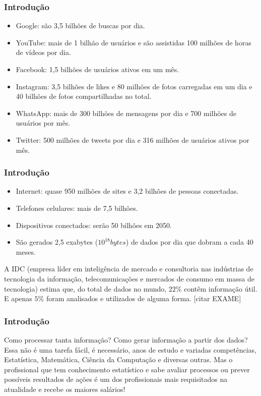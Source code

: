 \documentclass[14pt,aspectratio=1610]{beamer}
\begin{document}
\begin{frame}{}
\frametitle{Introdução}
\begin{block}{}
\justifying
\begin{itemize}
\item Google: são 3,5 bilhões de buscas por dia.\pause
\item YouTube: mais de 1 bilhão de usuários e são assistidas 100 milhões de horas de vídeos por dia.\pause
\item Facebook: 1,5 bilhões de usuários ativos em um mês.\pause
\item Instagram: 3,5 bilhões de likes e 80 milhões de fotos carregadas em um dia e 40 bilhões de fotos compartilhadas no total.\pause
\item WhatsApp: mais de 300 bilhões de mensagens por dia e 700 milhões de usuários por mês.\pause
\item Twitter: 500 milhões de tweets por dia e 316 milhões de usuários ativos por mês.
\end{itemize}
\end{block}
\end{frame}

\begin{frame}{}
\frametitle{Introdução}
\begin{block}{}
\justifying
\begin{itemize}
\item Internet: quase 950 milhões de sites e 3,2 bilhões de pessoas conectadas.\pause
\item Telefones celulares: mais de 7,5 bilhões.\pause
\item Dispositivos conectados: serão 50 bilhões em 2050.\pause
\item São gerados 2,5 exabytes ($10^{18} bytes$) de dados por dia que dobram a cada 40 meses.
\end{itemize}
\end{block}
\begin{block}{}
\justifying
A IDC (empresa líder em inteligência de mercado e consultoria nas indústrias de tecnologia da informação, telecomunicações e mercados de consumo em massa de tecnologia) estima que, do total de dados no mundo, $22\%$ contêm informação útil. E apenas $5\%$ foram analisados e utilizados de alguma forma. [citar EXAME]
\end{block}
\end{frame}

\begin{frame}{}
\frametitle{Introdução}
\begin{block}{}
\justifying
Como processar tanta informação? Como gerar informação a partir dos dados? Essa não é uma tarefa fácil, é necessário, anos de estudo e variadas competências, Estatística, Matemática, Ciência da Computação e diversas outras. Mas o profissional que tem conhecimento estatístico e sabe avaliar processos ou prever possíveis resultados de ações é um dos profissionais mais requisitados na atualidade e recebe os maiores salários!
\end{block}
\end{frame}
\end{document}
